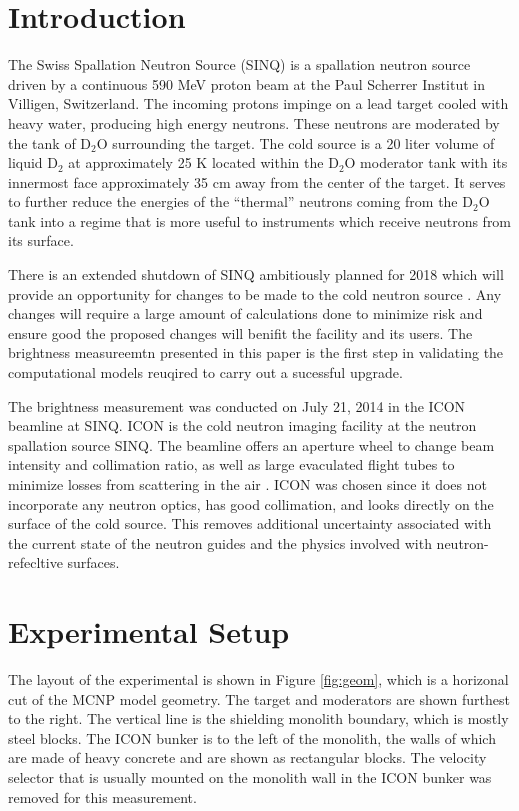 \documentclass[preprint,12pt]{elsarticle}
\begin{document}
\linenumbers


\section{Introduction}
\label{sec:intro}

The Swiss Spallation Neutron Source (SINQ) is a spallation neutron source driven by a continuous 590 MeV proton beam at the Paul Scherrer Institut in Villigen, Switzerland.  The incoming protons impinge on a lead target cooled with heavy water, producing high energy neutrons.  These neutrons are moderated by the tank of D$_2$O surrounding the target.  The cold source is a 20 liter volume of liquid D$_2$ at approximately 25 K located within the D$_2$O moderator tank with its innermost face approximately 35 cm away from the center of the target.  It serves to further reduce the energies of the ``thermal'' neutrons coming from the D$_2$O tank into a regime that is more useful to instruments which receive neutrons from its surface.  

There is an extended shutdown of SINQ ambitiously planned for 2018 which will provide an opportunity for changes to be made to the cold neutron source \cite{rueegg_icans}.  Any changes will require a large amount of calculations done to minimize risk and ensure good the proposed changes will benifit the facility and its users.  The brightness measureemtn presented in this paper is the first step in validating the computational models reuqired to carry out a sucessful upgrade.  

The brightness measurement was conducted on July 21, 2014 in the ICON beamline at SINQ.  ICON is the cold neutron imaging facility at the neutron spallation source SINQ. The beamline offers an aperture wheel to change beam intensity and collimation ratio, as well as large evaculated flight tubes to minimize losses from scattering in the air \cite{icon}.  ICON was chosen since it does not incorporate any neutron optics, has good collimation, and looks directly on the surface of the cold source.  This removes additional uncertainty associated with the current state of the neutron guides and the physics involved with neutron-refecltive surfaces.

\section{Experimental Setup}
\label{sec:setup}

The layout of the experimental is shown in Figure \ref{fig:geom}, which is a horizonal cut of the MCNP model geometry.  The target and moderators are shown furthest to the right.  The vertical line is the shielding monolith boundary, which is mostly steel blocks.  The ICON bunker is to the left of the monolith, the walls of which are made of heavy concrete and are shown as rectangular blocks.  The velocity selector that is usually mounted on the monolith wall in the ICON bunker was removed for this measurement.
\end{document}
